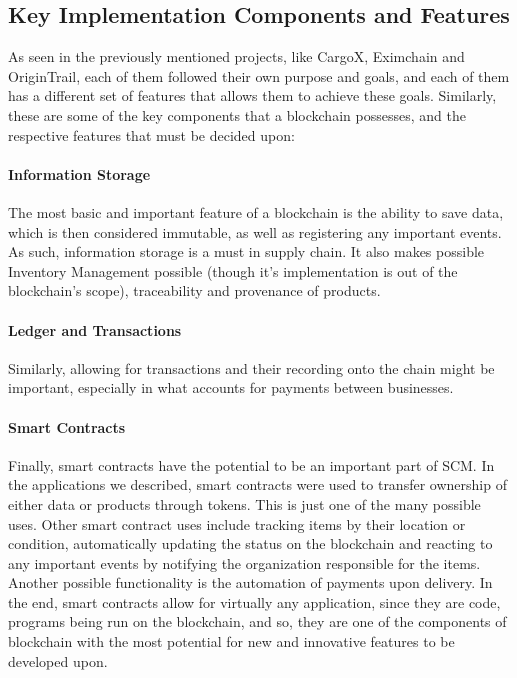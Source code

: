 \subsection{Key Implementation Components and Features}
As seen in the previously mentioned projects, like CargoX, Eximchain and OriginTrail, each of them followed their own purpose and goals, and each of them has a different set of features that allows them to achieve these goals. Similarly, these are some of the key components that a blockchain possesses, and the respective features that must be decided upon:

\paragraph{Information Storage}
The most basic and important feature of a blockchain is the ability to save data, which is then considered immutable, as well as registering any important events. As such, information storage is a must in supply chain. It also makes possible Inventory Management possible (though it's implementation is out of the blockchain's scope), traceability and provenance of products.
      
\paragraph{Ledger and Transactions}
Similarly, allowing for transactions and their recording onto the chain might be important, especially in what accounts for payments between businesses.
  
\paragraph{Smart Contracts}
Finally, smart contracts have the potential to be an important part of SCM. In the applications we described, smart contracts were used to transfer ownership of either data or products through tokens. This is just one of the many possible uses. Other smart contract uses include tracking items by their location or condition, automatically updating the status on the blockchain and reacting to any important events by notifying the organization responsible for the items. Another possible functionality is the automation of payments upon delivery. In the end, smart contracts allow for virtually any application, since they are code, programs being run on the blockchain, and so, they are one of the components of blockchain with the most potential for new and innovative features to be developed upon.
        


